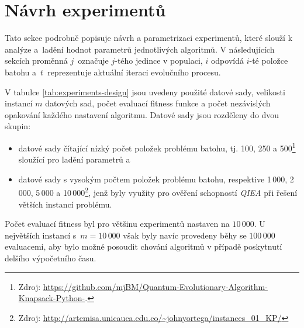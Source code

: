 \section{Návrh experimentů}\label{sec:experiments-design}
Tato sekce podrobně popisuje návrh a parametrizaci experimentů, které slouží k analýze a~ladění hodnot parametrů jednotlivých algoritmů. 
V následujících sekcích proměnná $j$~označuje $j$-tého jedince v populaci, $i$ odpovídá $i$-té položce batohu a~$t$~reprezentuje aktuální iteraci evolučního procesu. 

V tabulce \ref{tab:experiments-design} jsou uvedeny použité datové sady, velikosti instancí $m$ datových sad, počet evaluací fitness funkce a počet nezávislých opakování každého nastavení algoritmu. 
Datové sady jsou rozděleny do dvou skupin:
\begin{itemize}
    \item datové sady čítající nízký počet položek problému batohu, tj. 100, 250 a 500\footnote{Zdroj: \url{https://github.com/mjBM/Quantum-Evolutionary-Algorithm-Knapsack-Python-}.} sloužící pro ladění parametrů a
    \item datové sady s vysokým počtem položek problému batohu, respektive 1\,000, 2\,000, 5\,000 a 10\,000\footnote{Zdroj: \url{http://artemisa.unicauca.edu.co/~johnyortega/instances_01_KP/}}, jenž byly využity pro ověření schopností \emph{QIEA} při řešení větších instancí problému. 
\end{itemize}
Počet evaluací fitness byl pro většinu experimentů nastaven na $10\,000$. 
U největších instancí s~$m = 10\,000$ však byly navíc provedeny běhy se $100\,000$ evaluacemi, aby bylo možné posoudit chování algoritmů v případě poskytnutí delšího výpočetního času. 

